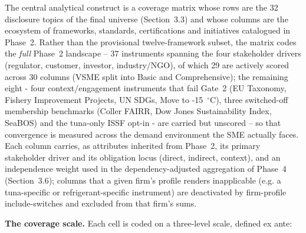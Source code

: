 \documentclass[
]{article}
\begin{document}
The central analytical construct is a coverage matrix whose rows are the
32 disclosure topics of the final universe (Section~3.3) and whose
columns are the ecosystem of frameworks, standards, certifications and
initiatives catalogued in Phase~2. Rather than the provisional
twelve-framework subset, the matrix codes the \emph{full} Phase~2
landscape -- 37 instruments spanning the four stakeholder
drivers (regulator, customer, investor, industry/NGO), of which 29 are
actively scored across 30 columns (VSME split into Basic and
Comprehensive); the remaining eight - four context/engagement
instruments that fail Gate~2 (EU Taxonomy, Fishery Improvement Projects,
UN SDGs, Move to -15~$^{\circ}$C), three switched-off membership
benchmarks (Coller FAIRR, Dow Jones Sustainability Index, SeaBOS) and the
tuna-only ISSF opt-in - are carried but unscored
-- so that convergence is measured across the demand environment the SME
actually faces. Each column carries, as attributes inherited from
Phase~2, its primary stakeholder driver and its obligation locus (direct,
indirect, context), and an independence weight used in the
dependency-adjusted aggregation of Phase~4 (Section~3.6); columns that a
given firm's profile renders inapplicable (e.g. a tuna-specific or
refrigerant-specific instrument) are deactivated by firm-profile
include-switches and excluded from that firm's sums.

\textbf{The coverage scale.} Each cell is coded on a three-level scale,
defined ex ante:
\end{document}
